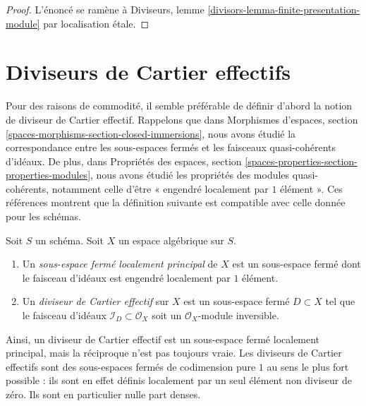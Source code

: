 \begin{proof}
L'énoncé se ramène à
Diviseurs, lemme \ref{divisors-lemma-finite-presentation-module}
par localisation \'etale.
\end{proof}














\section{Diviseurs de Cartier effectifs}
\label{section-effective-Cartier-divisors}

\noindent
Pour des raisons de commodité, il semble préférable de définir d'abord la notion de
diviseur de Cartier effectif. Rappelons que dans
Morphismes d'espaces, section \ref{spaces-morphisms-section-closed-immersions},
nous avons étudié la correspondance entre les sous-espaces fermés et les faisceaux
quasi-cohérents d'idéaux. De plus, dans
Propriétés des espaces, section
\ref{spaces-properties-section-properties-modules}, nous avons étudié les propriétés
des modules quasi-cohérents, notamment celle d'être « engendré localement par $1$ élément ».
Ces références montrent que la définition suivante est
compatible avec celle donnée pour les schémas.

\begin{definition}
\label{definition-effective-Cartier-divisor}
Soit $S$ un schéma. Soit $X$ un espace algébrique sur $S$.
\begin{enumerate}
\item Un {\it sous-espace fermé localement principal} de $X$ est un sous-espace fermé
dont le faisceau d'idéaux est engendré localement par $1$ élément.
\item Un {\it diviseur de Cartier effectif} sur $X$ est un sous-espace fermé
$D \subset X$ tel que le faisceau d'idéaux $\mathcal{I}_D \subset \mathcal{O}_X$
soit un $\mathcal{O}_X$-module inversible.
\end{enumerate}
\end{definition}

\noindent
Ainsi, un diviseur de Cartier effectif est un sous-espace fermé localement principal,
mais la réciproque n'est pas toujours vraie. Les diviseurs de Cartier effectifs sont des
sous-espaces fermés de codimension pure $1$ au sens le plus fort possible :
ils sont en effet définis localement par un seul élément non diviseur de zéro.
Ils sont en particulier nulle part denses.

